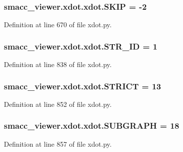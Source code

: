 \subsubsection[{\texorpdfstring{S\+K\+IP}{SKIP}}]{ smacc\+\_\+viewer.\+xdot.\+xdot.\+S\+K\+IP = -\/2}\hypertarget{namespacesmacc__viewer_1_1xdot_1_1xdot_ab0cfdee9b80be3fa9194ccbc99280445}{}\label{namespacesmacc__viewer_1_1xdot_1_1xdot_ab0cfdee9b80be3fa9194ccbc99280445}


Definition at line 670 of file xdot.\+py.

\subsubsection[{\texorpdfstring{S\+T\+R\+\_\+\+ID}{STR_ID}}]{ smacc\+\_\+viewer.\+xdot.\+xdot.\+S\+T\+R\+\_\+\+ID = 1}\hypertarget{namespacesmacc__viewer_1_1xdot_1_1xdot_a876e4c551a6b7b9b0626a4066e0ce540}{}\label{namespacesmacc__viewer_1_1xdot_1_1xdot_a876e4c551a6b7b9b0626a4066e0ce540}


Definition at line 838 of file xdot.\+py.

\subsubsection[{\texorpdfstring{S\+T\+R\+I\+CT}{STRICT}}]{ smacc\+\_\+viewer.\+xdot.\+xdot.\+S\+T\+R\+I\+CT = 13}\hypertarget{namespacesmacc__viewer_1_1xdot_1_1xdot_aa87476bc46090d21e9c9f1a71848a798}{}\label{namespacesmacc__viewer_1_1xdot_1_1xdot_aa87476bc46090d21e9c9f1a71848a798}


Definition at line 852 of file xdot.\+py.

\subsubsection[{\texorpdfstring{S\+U\+B\+G\+R\+A\+PH}{SUBGRAPH}}]{ smacc\+\_\+viewer.\+xdot.\+xdot.\+S\+U\+B\+G\+R\+A\+PH = 18}\hypertarget{namespacesmacc__viewer_1_1xdot_1_1xdot_a0e906aa89533c1317e80e111ea0931a1}{}\label{namespacesmacc__viewer_1_1xdot_1_1xdot_a0e906aa89533c1317e80e111ea0931a1}


Definition at line 857 of file xdot.\+py.

